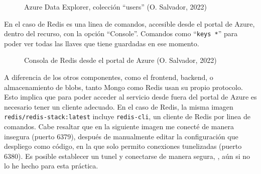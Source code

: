\documentclass[11pt]{article}
\begin{document}
\begin{flushleft}
		\begin{figure}[htb]
			\centering
			\caption{Azure Data Explorer, colección ``users'' (O. Salvador, 2022)}
		\end{figure}
		
	En el caso de Redis es una linea de comandos, accesible desde el portal de Azure, dentro del recurso, con la opción ``Console''. Comandos como ``\texttt{keys *}'' para poder ver todas las llaves que tiene guardadas en ese momento. 
	\linebreak
	
		\begin{figure}[htb]
			\centering
			\caption{Consola de Redis desde el portal de Azure (O. Salvador, 2022)}
			\label{consola_redis}
		\end{figure}
	
	
	\clearpage
	A diferencia de los otros componentes, como el frontend, backend, o almacenamiento de blobs, tanto Mongo como Redis usan su propio protocolo. Esto implica que para poder acceder al servicio desde fuera del portal de Azure es necesario tener un cliente adecuado. En el caso de Redis, la misma imagen \texttt{redis/redis-stack:latest} incluye \texttt{redis-cli}, un cliente de Redis por linea de comandos. Cabe resaltar que en la siguiente imagen me conecté de manera insegura (puerto 6379), después de manualmente editar la configuración que despliego como código, en la que solo permito conexiones tunelizadas (puerto 6380). Es posible establecer un tunel y conectarse de manera segura, \cite{redis_connect}, aún si no lo he hecho para esta práctica.
	\linebreak
	

\end{flushleft}
\end{document}
